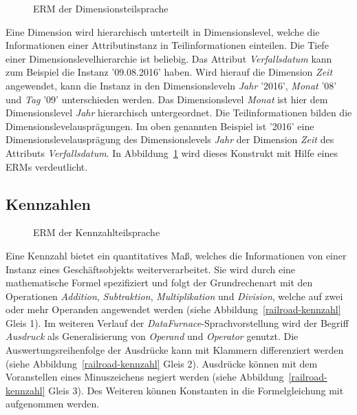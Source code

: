 \documentclass[
  language=german, %
  type=bachelor,%
  ngerman
]{isthesis}
\begin{document}
\begin{content}
  \begin{figure}
    \resizebox{175px}{!}{}
    \caption{\acrshort{ERM} der Dimensionsteilsprache}\label{dimension-erm}
  \end{figure}

	Eine Dimension wird hierarchisch unterteilt in Dimensionslevel, welche die
	Informationen einer Attributinstanz in Teilinformationen einteilen. Die Tiefe
	einer Dimensions\-level\-hierarchie ist beliebig. Das Attribut
	\textit{Verfallsdatum} kann zum Beispiel die Instanz '09.08.2016' haben. Wird
	hierauf die Dimension \textit{Zeit} angewendet, kann die Instanz in den
	Dimensions\-leveln \textit{Jahr} '2016', \textit{Monat} '08' und \textit{Tag}
	'09' unterschieden werden. Das Dimensions\-level \textit{Monat} ist hier dem
	Dimensions\-level \textit{Jahr} hierarchisch untergeordnet. Die
	Teilinformationen bilden die Dimensions\-levelausprägungen. Im oben genannten
	Beispiel ist '2016' eine Dimensions\-levelausprägung des Dimensions\-levels
	\textit{Jahr} der Dimension \textit{Zeit} des Attributs
	\textit{Verfallsdatum}. In Abbildung~\ref{dimension-erm} wird dieses
	Konstrukt mit Hilfe eines \acrshort{ERM}s verdeutlicht.

  \subsection{Kennzahlen}

  \begin{figure}
    \resizebox{250px}{!}{}
    \caption{\acrshort{ERM} der Kennzahlteilsprache}\label{kennzahl}
  \end{figure}

  Eine Kennzahl bietet ein quantitatives Maß, welches die Informationen von
  einer Instanz eines Geschäftsobjekts weiterverarbeitet. Sie wird durch eine
  mathematische Formel spezifiziert und folgt der Grundrechenart mit den
  Operationen \textit{Addition}, \textit{Subtraktion}, \textit{Multiplikation}
  und \textit{Division}, welche auf zwei oder mehr Operanden angewendet werden
  (siehe Abbildung~\ref{railroad-kennzahl} Gleis 1). Im weiteren Verlauf der
  \textit{DataFurnace}-Sprachvorstellung wird der Begriff \textit{Ausdruck} als
  Generalisierung von \textit{Operand} und \textit{Operator} genutzt.  Die
  Auswertungsreihenfolge der Ausdrücke kann mit Klammern differenziert werden
  (siehe Abbildung~\ref{railroad-kennzahl} Gleis 2).  Ausdrücke können mit dem
  Voranstellen eines Minuszeichens negiert werden (siehe
  Abbildung~\ref{railroad-kennzahl} Gleis 3). Des Weiteren können Konstanten in
  die Formelgleichung mit aufgenommen werden.


\end{content}
\end{document}
